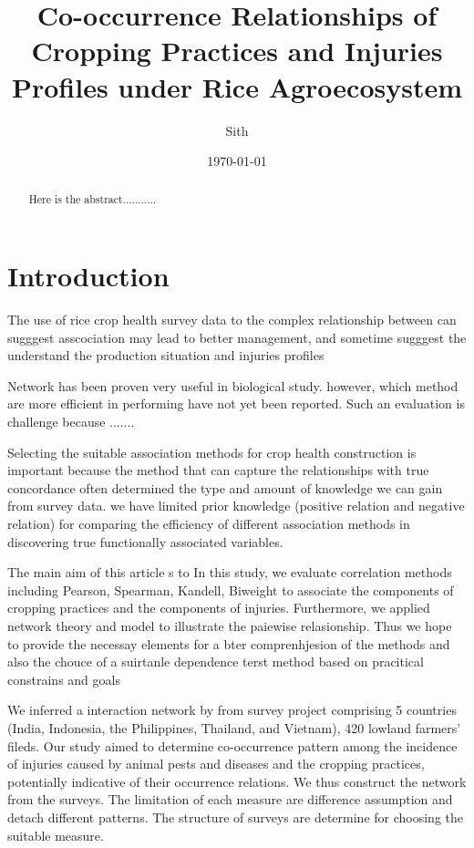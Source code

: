 \documentclass[a4paper]{article}
\title{Co-occurrence Relationships of Cropping Practices and Injuries Profiles under Rice Agroecosystem}
\author{Sith}
\date{\today}
\begin{document}
\maketitle

\begin{abstract}
Here is the abstract...........
\end{abstract}

\section*{Introduction}
The use of rice crop health survey data to the complex relationship between can sugggest asscociation may lead to better management, and sometime sugggest the understand the production situation and injuries profiles 

Network has been proven very useful in biological study. however, which method are more efficient in performing have not yet been reported. Such an evaluation is challenge because .......

Selecting the suitable association methods for crop health construction is important because the method that can capture the relationships with true concordance often determined the type and amount of knowledge we can gain from survey data.
we have limited prior knowledge (positive relation and negative relation) for comparing the efficiency of different association methods in discovering true functionally associated variables.


The main aim of this article s to In this study, we evaluate correlation methods including Pearson, Spearman, Kandell, Biweight to associate the components of cropping practices and the components of injuries. Furthermore, we applied network theory and model to illustrate the paiewise relasionship. Thus we hope to provide the necessay elements for a bter comprenhjesion of the methods and also the chouce of a suirtanle dependence terst method based on pracitical constrains and goals


We inferred a interaction network by from survey project comprising 5 countries (India, Indonesia, the Philippines, Thailand, and Vietnam), 420 lowland farmers' fileds. Our study aimed to determine co-occurrence pattern among the incidence of injuries caused by animal pests and diseases and the cropping practices, potentially indicative of their occurrence relations. We thus construct the network from the surveys. The limitation of each measure are difference assumption and detach different patterns. The structure of surveys are determine for choosing the suitable measure. 
\end{document}
